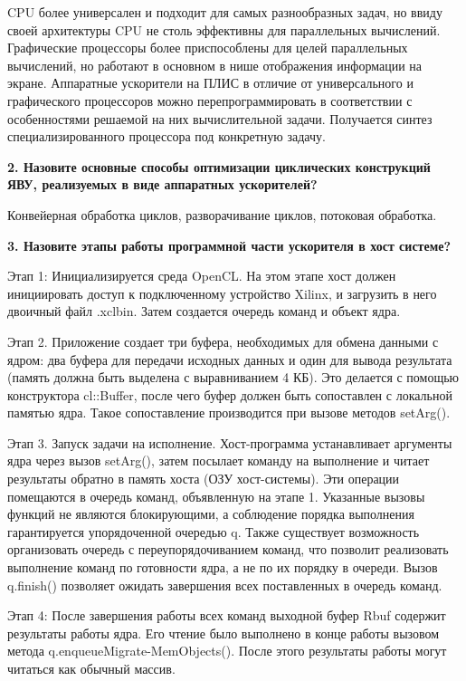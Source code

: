 \documentclass[12pt]{report}
\begin{document}
CPU более универсален и подходит для самых разнообразных задач, но ввиду своей архитектуры CPU не столь эффективны для параллельных вычислений. Графические процессоры более приспособлены для целей параллельных вычислений, но работают в основном в нише отображения информации на экране. Аппаратные ускорители на ПЛИС в отличие от универсального и графического процессоров можно перепрограммировать в соответствии с особенностями решаемой на них вычислительной задачи. Получается синтез специализированного процессора под конкретную задачу. 


\textbf{2. Назовите основные способы оптимизации циклических конструкций ЯВУ, реализуемых в виде аппаратных ускорителей?}

Конвейерная обработка циклов, разворачивание циклов, потоковая обработка.

\textbf{3. Назовите этапы работы программной части ускорителя в хост системе?}

Этап 1: Инициализируется среда OpenCL. На этом этапе хост должен инициировать доступ к подключенному устройство Xilinx, и загрузить в него двоичный файл .xclbin. Затем создается очередь команд и объект ядра.

Этап 2. Приложение создает три буфера, необходимых для обмена данными с ядром: два буфера для передачи исходных данных и один для вывода результата (память должна быть выделена с выравниванием 4 КБ). Это делается с помощью конструктора cl::Buffer, после чего буфер должен быть сопоставлен с локальной памятью ядра. Такое сопоставление производится при вызове методов setArg().

Этап 3. Запуск задачи на исполнение. Хост-программа устанавливает аргументы ядра через вызов setArg(), затем посылает команду на выполнение и читает результаты обратно в память хоста (ОЗУ хост-системы). Эти операции помещаются в очередь команд, объявленную на этапе 1. Указанные вызовы функций не являются блокирующими, а соблюдение порядка выполнения гарантируется упорядоченной очередью q. Также существует возможность организовать очередь с переупорядочиванием команд, что позволит реализовать выполнение команд по готовности ядра, а не по их порядку в очереди. Вызов q.finish() позволяет ожидать завершения всех поставленных в очередь команд.

Этап 4: После завершения работы всех команд выходной буфер Rbuf содержит результаты работы ядра. Его чтение было выполнено в конце работы вызовом метода q.enqueueMigrate-MemObjects(). После этого результаты работы могут читаться как обычный массив.
\end{document}
